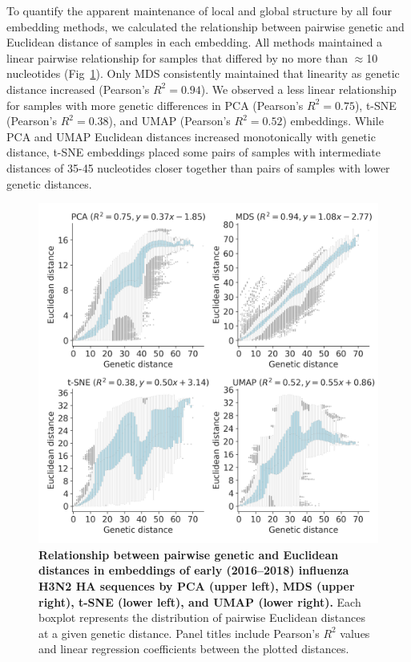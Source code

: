 \documentclass[webpdf,contemporary,large,single]{oup-authoring-template}%
\theoremstyle{thmstyleone}%
\theoremstyle{thmstyletwo}%
\theoremstyle{thmstylethree}%
\begin{document}
To quantify the apparent maintenance of local and global structure by all four embedding methods, we calculated the relationship between pairwise genetic and Euclidean distance of samples in each embedding.
All methods maintained a linear pairwise relationship for samples that differed by no more than $\approx$10 nucleotides (Fig~\ref{fig:seasonal-influenza-h3n2-ha-pairwise-distances}).
Only MDS consistently maintained that linearity as genetic distance increased (Pearson's $R^{2} = 0.94$).
We observed a less linear relationship for samples with more genetic differences in PCA (Pearson's $R^{2} = 0.75$), t-SNE (Pearson's $R^{2} = 0.38$), and UMAP (Pearson's $R^{2} = 0.52$) embeddings.
While PCA and UMAP Euclidean distances increased monotonically with genetic distance, t-SNE embeddings placed some pairs of samples with intermediate distances of 35-45 nucleotides closer together than pairs of samples with lower genetic distances.

\begin{figure}[!h]
\includegraphics[width=0.9\columnwidth]{figures/flu-2016-2018-ha-euclidean-distance-by-genetic-distance.png}
\caption{{\bf Relationship between pairwise genetic and Euclidean distances in embeddings of early (2016--2018) influenza H3N2 HA sequences by PCA (upper left), MDS (upper right), t-SNE (lower left), and UMAP (lower right).}
  Each boxplot represents the distribution of pairwise Euclidean distances at a given genetic distance.
  Panel titles include Pearson's $R^{2}$ values and linear regression coefficients between the plotted distances.
}
\label{fig:seasonal-influenza-h3n2-ha-pairwise-distances}
\end{figure}
\end{document}
